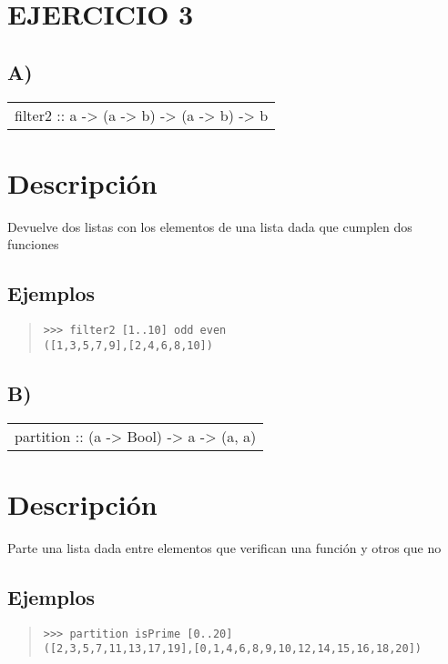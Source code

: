 \section{EJERCICIO 3}
\subsection{A)}
\begin{haddockdesc}
\item[\begin{tabular}{@{}l}
filter2 :: {\char 91}a{\char 93} -> (a -> b) -> (a -> b) -> {\char 91}{\char 91}b{\char 93}{\char 93}
\end{tabular}]
{\haddockbegindoc
\section*{Descripción}
Devuelve dos listas con los elementos de una lista dada que cumplen dos funciones\par
\subsection*{Ejemplos}
\begin{quote}
{\haddockverb\begin{verbatim}
>>> filter2 [1..10] odd even
([1,3,5,7,9],[2,4,6,8,10])

\end{verbatim}}
\end{quote}}
\end{haddockdesc}
\subsection{B)}
\begin{haddockdesc}
\item[\begin{tabular}{@{}l}
partition :: (a -> Bool) -> {\char 91}a{\char 93} -> ({\char 91}a{\char 93}, {\char 91}a{\char 93})
\end{tabular}]
{\haddockbegindoc
\section*{Descripción}
Parte una lista dada entre elementos que verifican una función y otros que no\par
\subsection*{Ejemplos}
\begin{quote}
{\haddockverb\begin{verbatim}
>>> partition isPrime [0..20]
([2,3,5,7,11,13,17,19],[0,1,4,6,8,9,10,12,14,15,16,18,20])

\end{verbatim}}
\end{quote}}
\end{haddockdesc}

